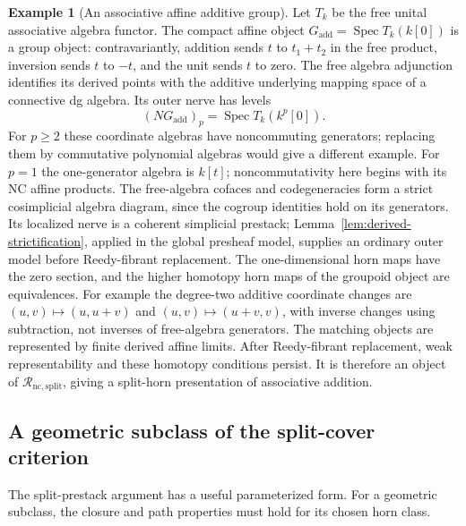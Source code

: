 \documentclass[12pt]{amsart}
\theoremstyle{definition}
\newtheorem{example}[thm]{Example}
\theoremstyle{remark}
\numberwithin{equation}{section}
\DeclareMathOperator{\Spec}{Spec}
\begin{document}
\begin{example}[An associative affine additive group]
\label{ex:nc-additive-nerve}
Let $T_k$ be the free unital associative algebra functor. The
compact affine object $G_{\mathrm{add}}=\Spec T_k(k[0])$ is a
group object: contravariantly, addition sends $t$ to $t_1+t_2$ in
the free product, inversion sends $t$ to $-t$, and the unit sends
$t$ to zero. The free algebra adjunction identifies its derived
points with the additive underlying mapping space of a connective
dg algebra. Its outer nerve has levels
\[
 (NG_{\mathrm{add}})_p
       =\Spec T_k(k^p[0]).
\]
For $p\ge2$ these coordinate algebras have noncommuting
generators; replacing them by commutative polynomial algebras
would give a different example. For $p=1$ the one-generator
algebra is $k[t]$; noncommutativity here begins with its NC affine
products. The free-algebra cofaces and codegeneracies form a
strict cosimplicial algebra diagram, since the cogroup identities
hold on its generators. Its localized nerve is a coherent
simplicial prestack; Lemma~\ref{lem:derived-strictification},
applied in the global presheaf model, supplies an ordinary outer
model before Reedy-fibrant replacement. The one-dimensional horn
maps have the zero section, and the higher homotopy horn maps of
the groupoid object are equivalences. For example the degree-two
additive coordinate changes are $(u,v)\mapsto(u,u+v)$ and
$(u,v)\mapsto(u+v,v)$, with inverse changes using subtraction, not
inverses of free-algebra generators. The matching objects are
represented by finite derived affine limits. After Reedy-fibrant
replacement, weak representability and these homotopy conditions
persist. It is therefore an object of
$\mathscr R_{\mathrm{nc,split}}$, giving a split-horn
presentation of associative addition.
\end{example}

\subsection{A geometric subclass of the split-cover criterion}

The split-prestack argument has a useful parameterized form.
For a geometric subclass, the closure and path properties
must hold for its chosen horn class.
\end{document}
